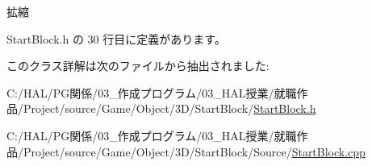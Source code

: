 拡縮 



 Start\+Block.\+h の 30 行目に定義があります。



このクラス詳解は次のファイルから抽出されました\+:\begin{DoxyCompactItemize}
\item 
C\+:/\+H\+A\+L/\+P\+G関係/03\+\_\+作成プログラム/03\+\_\+\+H\+A\+L授業/就職作品/\+Project/source/\+Game/\+Object/3\+D/\+Start\+Block/\mbox{\hyperlink{_start_block_8h}{Start\+Block.\+h}}\item 
C\+:/\+H\+A\+L/\+P\+G関係/03\+\_\+作成プログラム/03\+\_\+\+H\+A\+L授業/就職作品/\+Project/source/\+Game/\+Object/3\+D/\+Start\+Block/\+Source/\mbox{\hyperlink{_start_block_8cpp}{Start\+Block.\+cpp}}\end{DoxyCompactItemize}
